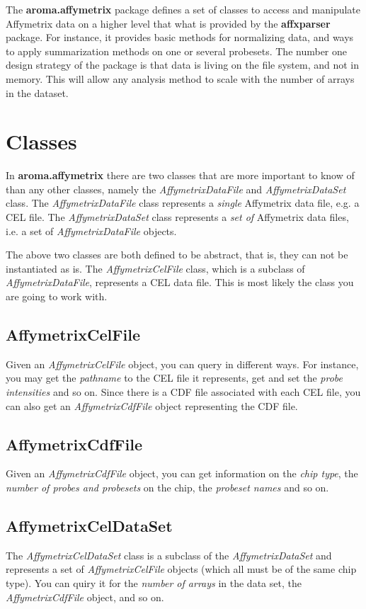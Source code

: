 \documentclass[12pt,a4paper]{article}
\newcommand{\package}[1]{\textbf{#1}\xspace}
\newcommand{\class}[1]{\textsl{#1}\xspace}
\begin{document}
The \package{aroma.affymetrix} package defines a set of classes to access and manipulate Affymetrix data on a higher level that what is provided by the \package{affxparser} package.  For instance, it provides basic methods for normalizing data, and ways to apply summarization methods on one or several probesets.  
The number one design strategy of the package is that data is living on the file system, and not in memory.  This will allow any analysis method to scale with the number of arrays in the dataset.

\section{Classes}
In \package{aroma.affymetrix} there are two classes that are more important to know of than any other classes, namely the \class{AffymetrixDataFile} and \class{AffymetrixDataSet} class.  
The \class{AffymetrixDataFile} class represents a \emph{single} Affymetrix data file, e.g. a CEL file.
The \class{AffymetrixDataSet} class represents a \emph{set of} Affymetrix data files, i.e. a set of \class{AffymetrixDataFile} objects.

The above two classes are both defined to be abstract, that is, they can not be instantiated as is.  The \class{AffymetrixCelFile} class, which is a subclass of \class{AffymetrixDataFile}, represents a CEL data file.  This is most likely the class you are going to work with.

\subsection{AffymetrixCelFile}
Given an \class{AffymetrixCelFile} object, you can query in different ways.  For instance, you may get the \emph{pathname} to the CEL file it represents, get and set the \emph{probe intensities} and so on.  Since there is a CDF file associated with each CEL file, you can also get an \class{AffymetrixCdfFile} object representing the CDF file.  

\subsection{AffymetrixCdfFile}
Given an \class{AffymetrixCdfFile} object, you can get information on the \emph{chip type}, the \emph{number of probes and probesets} on the chip, the \emph{probeset names} and so on.

\subsection{AffymetrixCelDataSet}
The \class{AffymetrixCelDataSet} class is a subclass of the \class{AffymetrixDataSet} and represents a set of \class{AffymetrixCelFile} objects (which all must be of the same chip type).  You can quiry it for the \emph{number of arrays} in the data set, the \class{AffymetrixCdfFile} object, and so on.
\end{document}
